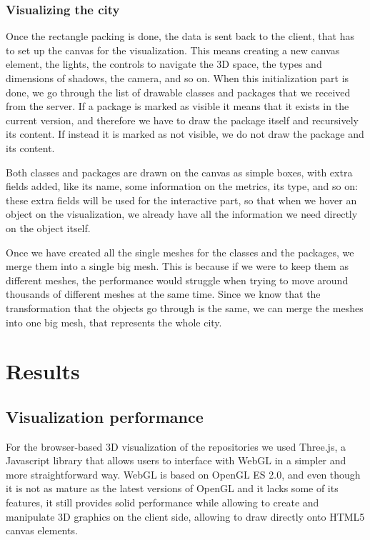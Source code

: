 \documentclass[]{usiinfbachelorproject}
\begin{document}
\subsubsection{Visualizing the city} \label{Visualizing the city}
Once the rectangle packing is done, the data is sent back to the client, that has to set up the canvas for the visualization. This means creating a new canvas element, the lights, the controls to navigate the 3D space, the types and dimensions of shadows, the camera, and so on.
When this initialization part is done, we go through the list of drawable classes and packages that we received from the server. If a package is marked as visible it means that it exists in the current version, and therefore we have to draw the package itself and recursively its content. If instead it is marked as not visible, we do not draw the package and its content.

Both classes and packages are drawn on the canvas as simple boxes, with extra fields added, like its name, some information on the metrics, its type, and so on: these extra fields will be used for the interactive part, so that when we hover an object on the visualization, we already have all the information we need directly on the object itself.

Once we have created all the single meshes for the classes and the packages, we merge them into a single big mesh.
This is because if we were to keep them as different meshes, the performance would struggle when trying to move around thousands of different meshes at the same time. Since we know that the transformation that the objects go through is the same, we can merge the meshes into one big mesh, that represents the whole city.

\section{Results} \label{Results}

\subsection{Visualization performance} \label{Visualization performance}

For the browser-based 3D visualization of the repositories we used Three.js, a Javascript library that allows users to interface with WebGL in a simpler and more straightforward way. WebGL is based on OpenGL ES 2.0, and even though it is not as mature as the latest versions of OpenGL and it lacks some of its features, it still provides solid performance while allowing to create and manipulate 3D graphics on the client side, allowing to draw directly onto HTML5 canvas elements.
\end{document}
